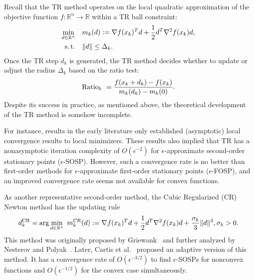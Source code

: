 Recall that the TR method operates on the local quadratic approximation of the objective function $f:\mathbb{R}^n\to \mathbb{R}$ within a TR ball constraint:
\begin{equation}\label{eq.classic tr subproblem}
    \begin{aligned}
        \min_{d \in \mathbb{R}^n} \quad &m_k(d):= \nabla f(x_k)^T d+\frac{1}{2}d^T \nabla^2 f(x_k) d, \\
        \operatorname{s.t.} \quad &\|d\|\le \Delta_k.
    \end{aligned}
\end{equation}
Once the TR step $d_k$ is generated, the TR method decides whether to update or adjust the radius $\Delta_k$ based on the ratio test:
\begin{equation}\label{eq.ratio test}
    \textnormal{Ratio}_k ~= \frac{f(x_k + d_k) - f(x_k)}{m_k(d_k) - m_k(0)}.
\end{equation}
Despite its success in practice, as mentioned above, the theoretical development of the TR method is somehow incomplete. 

For instance, results in the early literature \citep{sorensen_newtons_1982,shultz_family_1985,conn2000trust} only established (asymptotic) local convergence results to local minimizers. These results also implied that TR has a nonasymptotic iteration complexity of $O(\epsilon^{-2})$ for $\epsilon$-approximate second-order stationary points ($\epsilon$-SOSP). However, such a convergence rate is no better than first-order methods \citep{nesterov_lectures_2018} for $\epsilon$-approximate first-order stationary points ($\epsilon$-FOSP), and an improved convergence rate seems not available for
convex functions.

As another representative second-order method, the Cubic Regularized (CR) Newton method has the updating rule
\begin{equation}\label{eq.arc}
    \dk^\text{CR} = \arg\min_{d \in \mathbb{R}^n} \ m^{\text{CR}}_k(d):=\nabla f(\xk)^T d+\frac{1}{2}d^T \nabla^2 f(\xk) d + \frac{\sigma_k}{3}\|d\|^3, \sigma_k > 0.
\end{equation}
This method was originally proposed by Griewank~\cite{griewank1981modification} and further analyzed by Nesterov and Polyak~\cite{nesterov2006cubic}. Later, Cartis et al.~\cite{cartis2011adaptive1,cartis2011adaptive2} proposed an adaptive version of this method. It has a convergence rate of $O(\epsilon^{-3/2})$ to find $\epsilon$-SOSPs for nonconvex functions and $O(\epsilon^{-1/2})$ for the convex case simultaneously.

